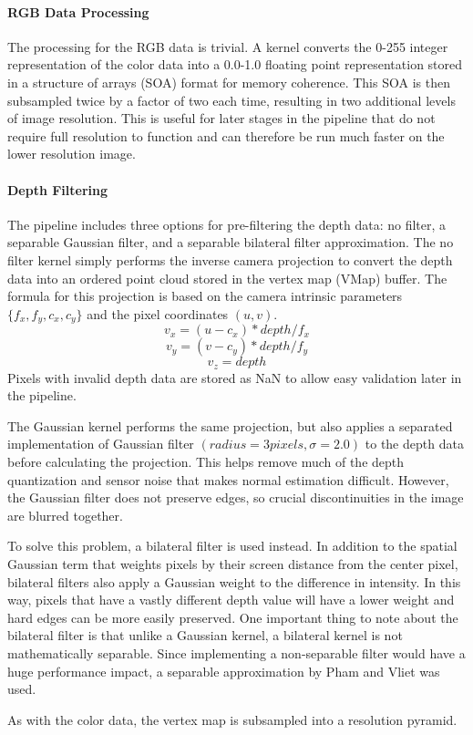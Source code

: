 \paragraph{RGB Data Processing} 
The processing for the RGB data is trivial. A kernel converts the 0-255 integer representation of the color data into a 0.0-1.0 floating point representation stored in a structure of arrays (SOA) format for memory coherence. This SOA is then subsampled twice by a factor of two each time, resulting in two additional levels of image resolution. This is useful for later stages in the pipeline that do not require full resolution to function and can therefore be run much faster on the lower resolution image.
\paragraph{Depth Filtering}
The pipeline includes three options for pre-filtering the depth data: no filter, a separable Gaussian filter, and a separable bilateral filter approximation\cite{pham2005separable}. The no filter kernel simply performs the inverse camera projection to convert the depth data into an ordered point cloud stored in the vertex map (VMap) buffer. The formula for this projection is based on the camera intrinsic parameters $\{f_x,f_y,c_x,c_y\}$ and the pixel coordinates $(u,v)$.
$$v_x = (u - c_x) * depth / f_x$$
$$v_y = (v - c_y) * depth / f_y$$
$$v_z = depth$$
Pixels with invalid depth data are stored as NaN to allow easy validation later in the pipeline.\par 
The Gaussian kernel performs the same projection, but also applies a separated implementation of Gaussian filter  $(radius=3 pixels,\sigma=2.0)$ to the depth data before calculating the projection. This helps remove much of the depth quantization and sensor noise that makes normal estimation difficult. However, the Gaussian filter does not preserve edges, so crucial discontinuities in the image are blurred together.\par 
To solve this problem, a bilateral filter is used instead. In addition to the spatial Gaussian term that weights pixels by their screen distance from the center pixel, bilateral filters also apply a Gaussian weight to the difference in intensity. In this way, pixels that have a vastly different depth value will have a lower weight and hard edges can be more easily preserved. One important thing to note about the bilateral filter is that unlike a Gaussian kernel, a bilateral kernel is not mathematically separable. Since implementing a non-separable filter would have a huge performance impact, a separable approximation by Pham and Vliet was used\cite{pham2005separable}.\par 
As with the color data, the vertex map is subsampled into a resolution pyramid.
